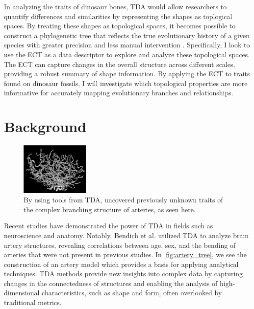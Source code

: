 \documentclass[12pt]{article}
\begin{document}
In analyzing the traits of dinosaur bones, TDA would allow researchers to quantify
differences and similarities by representing the shapes as toplogical spaces. By 
treating these shapes as topological spaces, it becomes possible to construct a 
phylogenetic tree that reflects the true evolutionary history of a given species 
with greater precision and less manual intervention \citep{yang2012}.
Specifically, I look to use the ECT as a data descriptor to explore and analyze
these topological spaces. The ECT can capture changes in the overall structure
across different scales, providing a robust summary of shape information. By
applying the ECT to traits found on dinosaur fossils, I will investigate which
topological properties are more informative for accurately mapping evolutionary
branches and relationships. 


\section{Background}
\begin{figure}
	\centering
	\vspace{-12pt}
	\includegraphics[width=0.3\textwidth]{arteryTree.png}
	\caption{By using tools from TDA, \cite{bendich2016} uncovered previously
unknown traits of the complex branching structure of arteries, as seen here.}
	\label{fig:artery_tree}
\end{figure}
\vspace{-12pt}

Recent studies have demonstrated the power of TDA in fields such as neuroscience
and anatomy. Notably, Bendich et al. \cite{bendich2016} utilized 
TDA to analyze brain artery structures, revealing correlations between age, sex, 
and the bending of arteries that were not present in previous studies. In
\autoref{fig:artery_tree}, we see the construction of an artery model which
provides a basis for applying analytical techniques. TDA methods provide new 
insights into complex data by capturing changes in the connectedness of 
structures and enabling the analysis of high-dimensional characteristics, 
such as shape and form, often overlooked by traditional metrics. 
\end{document}
